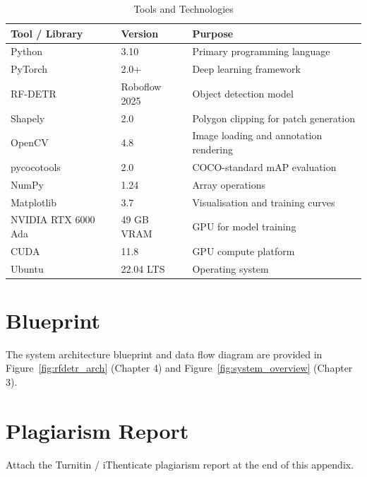 \begin{table}[H]
\centering
\caption{Tools and Technologies}
\begin{tabular}{lll}
\toprule
\rowcolor{tableHeader}\tableheadfont Tool / Library & \tableheadfont Version & \tableheadfont Purpose \\
\midrule
Python           & 3.10     & Primary programming language \\
\rowcolor{tableRowAlt}PyTorch          & 2.0+     & Deep learning framework \\
RF-DETR          & Roboflow 2025 & Object detection model \\
\rowcolor{tableRowAlt}Shapely          & 2.0      & Polygon clipping for patch generation \\
OpenCV           & 4.8      & Image loading and annotation rendering \\
\rowcolor{tableRowAlt}pycocotools      & 2.0      & COCO-standard mAP evaluation \\
NumPy            & 1.24     & Array operations \\
\rowcolor{tableRowAlt}Matplotlib       & 3.7      & Visualisation and training curves \\
NVIDIA RTX 6000 Ada & 49 GB VRAM & GPU for model training \\
\rowcolor{tableRowAlt}CUDA             & 11.8     & GPU compute platform \\
Ubuntu           & 22.04 LTS & Operating system \\
\bottomrule
\end{tabular}
\end{table}

\section{Blueprint}

The system architecture blueprint and data flow diagram are provided in Figure~\ref{fig:rfdetr_arch} (Chapter 4) and Figure~\ref{fig:system_overview} (Chapter 3).

\section{Plagiarism Report}

Attach the Turnitin / iThenticate plagiarism report at the end of this appendix.
